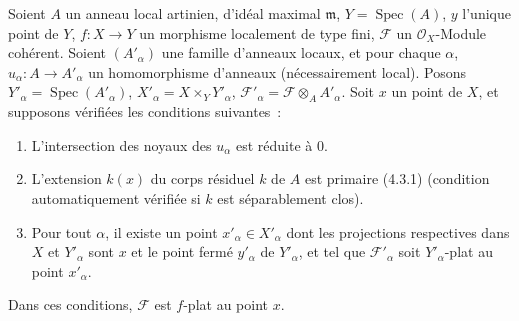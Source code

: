 \begin{proposition}[11.4.11]
\label{IV.11.4.11-fr}
Soient $A$ un anneau local artinien, d'idéal maximal $\mathfrak m$,
$Y=\operatorname{Spec}(A)$, $y$ l'unique point de $Y$, $f:X\to Y$ un morphisme
localement de type fini, $\mathcal F$ un $\mathcal O_X$-Module cohérent. Soient
$(A'_\alpha)$ une famille d'anneaux locaux, et pour chaque $\alpha$,
$u_\alpha:A\to A'_\alpha$ un homomorphisme d'anneaux (nécessairement local).
Posons $Y'_\alpha=\operatorname{Spec}(A'_\alpha)$,
$X'_\alpha=X\times_Y Y'_\alpha$,
$\mathcal F'_\alpha=\mathcal F\otimes_A A'_\alpha$. Soit $x$ un point de $X$,
et supposons vérifiées les conditions suivantes~:
\begin{enumerate}[label=(\roman*)]
  \item L'intersection des noyaux des $u_\alpha$ est réduite à $0$.
  \item L'extension $k(x)$ du corps résiduel $k$ de $A$ est primaire (4.3.1)
  (condition automatiquement vérifiée si $k$ est séparablement clos).
  \item Pour tout $\alpha$, il existe un point $x'_\alpha\in X'_\alpha$ dont
  les projections respectives dans $X$ et $Y'_\alpha$ sont $x$ et le point
  fermé $y'_\alpha$ de $Y'_\alpha$, et tel que $\mathcal F'_\alpha$ soit
  $Y'_\alpha$-plat au point $x'_\alpha$.
\end{enumerate}
Dans ces conditions, $\mathcal F$ est $f$-plat au point $x$.
\end{proposition}

